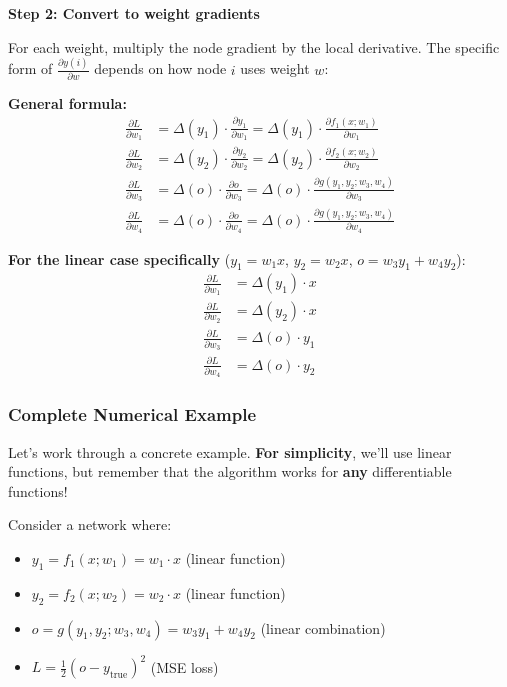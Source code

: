 \begin{notechapter}
\begin{center}
\begin{tikzpicture}
\end{tikzpicture}
\end{center}

\textbf{Step 2: Convert to weight gradients}

For each weight, multiply the node gradient by the local derivative. The specific form of $\frac{\partial y(i)}{\partial w}$ depends on how node $i$ uses weight $w$:

\textbf{General formula:}
\begin{align*}
\frac{\partial L}{\partial w_1} &= \Delta(y_1) \cdot \frac{\partial y_1}{\partial w_1} = \Delta(y_1) \cdot \frac{\partial f_1(x; w_1)}{\partial w_1}\\
\frac{\partial L}{\partial w_2} &= \Delta(y_2) \cdot \frac{\partial y_2}{\partial w_2} = \Delta(y_2) \cdot \frac{\partial f_2(x; w_2)}{\partial w_2}\\
\frac{\partial L}{\partial w_3} &= \Delta(o) \cdot \frac{\partial o}{\partial w_3} = \Delta(o) \cdot \frac{\partial g(y_1, y_2; w_3, w_4)}{\partial w_3}\\
\frac{\partial L}{\partial w_4} &= \Delta(o) \cdot \frac{\partial o}{\partial w_4} = \Delta(o) \cdot \frac{\partial g(y_1, y_2; w_3, w_4)}{\partial w_4}
\end{align*}

\textbf{For the linear case specifically} ($y_1 = w_1 x$, $y_2 = w_2 x$, $o = w_3 y_1 + w_4 y_2$):
\begin{align*}
\frac{\partial L}{\partial w_1} &= \Delta(y_1) \cdot x\\
\frac{\partial L}{\partial w_2} &= \Delta(y_2) \cdot x\\
\frac{\partial L}{\partial w_3} &= \Delta(o) \cdot y_1\\
\frac{\partial L}{\partial w_4} &= \Delta(o) \cdot y_2
\end{align*}

\subsubsection{Complete Numerical Example}

Let's work through a concrete example. \textbf{For simplicity}, we'll use linear functions, but remember that the algorithm works for \textbf{any} differentiable functions!

\begin{example}
Consider a network where:
\begin{itemize}
    \item $y_1 = f_1(x; w_1) = w_1 \cdot x$ (linear function)
    \item $y_2 = f_2(x; w_2) = w_2 \cdot x$ (linear function)
    \item $o = g(y_1, y_2; w_3, w_4) = w_3 y_1 + w_4 y_2$ (linear combination)
    \item $L = \frac{1}{2}(o - y_{\text{true}})^2$ (MSE loss)
\end{itemize}


\end{example}
\end{notechapter}
